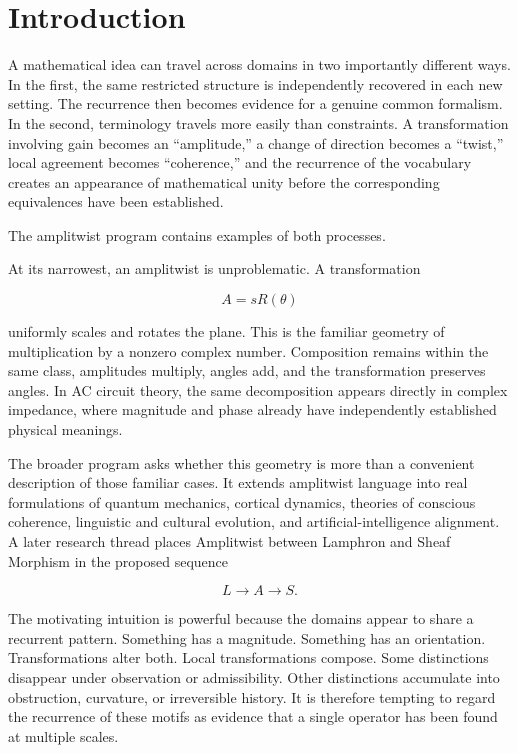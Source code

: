\documentclass[11pt]{article}
\begin{document}
\section*{Introduction}

A mathematical idea can travel across domains in two importantly different ways. In the first, the same restricted structure is independently recovered in each new setting. The recurrence then becomes evidence for a genuine common formalism. In the second, terminology travels more easily than constraints. A transformation involving gain becomes an ``amplitude,'' a change of direction becomes a ``twist,'' local agreement becomes ``coherence,'' and the recurrence of the vocabulary creates an appearance of mathematical unity before the corresponding equivalences have been established.

The amplitwist program contains examples of both processes.

At its narrowest, an amplitwist is unproblematic. A transformation

\begin{equation}
A=sR(\theta)
\end{equation}

uniformly scales and rotates the plane. This is the familiar geometry of multiplication by a nonzero complex number. Composition remains within the same class, amplitudes multiply, angles add, and the transformation preserves angles. In AC circuit theory, the same decomposition appears directly in complex impedance, where magnitude and phase already have independently established physical meanings.

The broader program asks whether this geometry is more than a convenient description of those familiar cases. It extends amplitwist language into real formulations of quantum mechanics, cortical dynamics, theories of conscious coherence, linguistic and cultural evolution, and artificial-intelligence alignment. A later research thread places Amplitwist between Lamphron and Sheaf Morphism in the proposed sequence

\begin{equation}
L\longrightarrow A\longrightarrow S.
\end{equation}

The motivating intuition is powerful because the domains appear to share a recurrent pattern. Something has a magnitude. Something has an orientation. Transformations alter both. Local transformations compose. Some distinctions disappear under observation or admissibility. Other distinctions accumulate into obstruction, curvature, or irreversible history. It is therefore tempting to regard the recurrence of these motifs as evidence that a single operator has been found at multiple scales.
\end{document}
